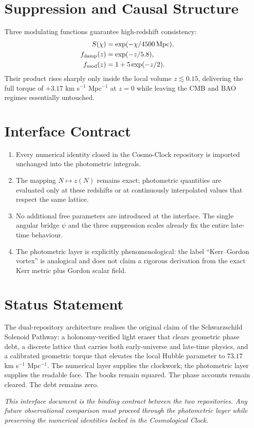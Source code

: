 \documentclass[11pt,a4paper]{article}
\begin{document}
\section{Suppression and Causal Structure}

Three modulating functions guarantee high-redshift consistency:
\begin{align}
S(\chi) &= \exp(-\chi/4500\,{\rm Mpc}), \\
f_{\rm damp}(z) &= \exp(-z/5.8), \\
f_{\rm mod}(z) &= 1 + 5\exp(-z/2).
\end{align}
Their product rises sharply only inside the local volume \(z\lesssim0.15\), delivering the full torque of \(+3.17\) km s$^{-1}$ Mpc$^{-1}$ at \(z=0\) while leaving the CMB and BAO regimes essentially untouched.

\section{Interface Contract}

\begin{enumerate}
  \item Every numerical identity closed in the Cosmo-Clock repository is imported unchanged into the photometric integrals.
  \item The mapping \(N\mapsto z(N)\) remains exact; photometric quantities are evaluated only at these redshifts or at continuously interpolated values that respect the same lattice.
  \item No additional free parameters are introduced at the interface. The single angular bridge \(\psi\) and the three suppression scales already fix the entire late-time behaviour.
  \item The photometric layer is explicitly phenomenological: the label ``Kerr--Gordon vortex'' is analogical and does not claim a rigorous derivation from the exact Kerr metric plus Gordon scalar field.
\end{enumerate}

\section{Status Statement}

The dual-repository architecture realises the original claim of the Schwarzschild Solenoid Pathway: a holonomy-verified light eraser that clears geometric phase debt, a discrete lattice that carries both early-universe and late-time physics, and a calibrated geometric torque that elevates the local Hubble parameter to \(73.17\) km s$^{-1}$ Mpc$^{-1}$. The numerical layer supplies the clockwork; the photometric layer supplies the readable face. The books remain squared. The phase accounts remain cleared. The debt remains zero.

\vspace{1cm}
\noindent\textit{This interface document is the binding contract between the two repositories. Any future observational comparison must proceed through the photometric layer while preserving the numerical identities locked in the Cosmological Clock.}
\end{document}
